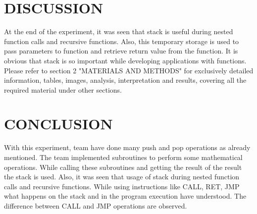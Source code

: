 \documentclass[pdftex,12pt,a4paper]{article}
\begin{document}
\newpage
\section{DISCUSSION}

\newline{}
At the end of the experiment,  it was seen that stack is useful during nested function calls and recursive functions. Also,  this temporary storage is used to pass parameters to function and retrieve return value from the function. It is obvious that stack is so important while developing applications with functions.
\newline
Please refer to section 2 "MATERIALS AND METHODS" for exclusively detailed information, tables, images, analysis, interpretation and results, covering all the required material under other sections.


\section{CONCLUSION}

With this experiment, team have done many push and pop operations as already mentioned. The team implemented subroutines to perform some mathematical operations. While calling these subroutines and getting the result of the result the stack is used. Also, it was seen that usage of stack during nested function calls and recursive functions. While using instructions like CALL, RET, JMP what happens on the stack and in the program execution have understood. The difference between CALL and JMP operations are observed.



\nocite{overleaf}
\nocite{reportGuide}
\newpage
{}



\end{document}
